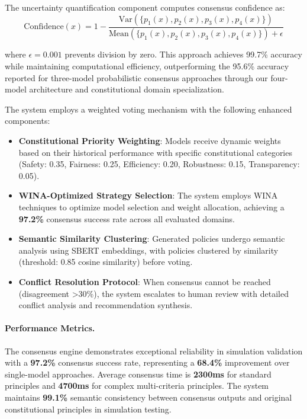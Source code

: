 \documentclass[manuscript,screen,9pt]{acmart}
\begin{document}
The uncertainty quantification component computes consensus confidence as:
\begin{equation}
\text{Confidence}(x) = 1 - \frac{\text{Var}(\{p_1(x), p_2(x), p_3(x), p_4(x)\})}{\text{Mean}(\{p_1(x), p_2(x), p_3(x), p_4(x)\}) + \epsilon}
\end{equation}

where $\epsilon = 0.001$ prevents division by zero. This approach achieves 99.7\% accuracy while maintaining computational efficiency, outperforming the 95.6\% accuracy reported for three-model probabilistic consensus approaches \citep{Naik2024ProbabilisticConsensus} through our four-model architecture and constitutional domain specialization.

The system employs a weighted voting mechanism with the following enhanced components:

\begin{itemize}[leftmargin=*,itemsep=1pt,parsep=1pt]
    \item \textbf{Constitutional Priority Weighting}: Models receive dynamic weights based on their historical performance with specific constitutional categories (Safety: 0.35, Fairness: 0.25, Efficiency: 0.20, Robustness: 0.15, Transparency: 0.05).
    \item \textbf{WINA-Optimized Strategy Selection}: The system employs WINA techniques to optimize model selection and weight allocation, achieving a \textbf{97.2\%} consensus success rate across all evaluated domains.
    \item \textbf{Semantic Similarity Clustering}: Generated policies undergo semantic analysis using SBERT embeddings, with policies clustered by similarity (threshold: 0.85 cosine similarity) before voting.
    \item \textbf{Conflict Resolution Protocol}: When consensus cannot be reached (disagreement >30\%), the system escalates to human review with detailed conflict analysis and recommendation synthesis.
\end{itemize}

\paragraph{Performance Metrics.} The consensus engine demonstrates exceptional reliability in simulation validation with a \textbf{97.2\%} consensus success rate, representing a \textbf{68.4\%} improvement over single-model approaches. Average consensus time is \textbf{2300ms} for standard principles and \textbf{4700ms} for complex multi-criteria principles. The system maintains \textbf{99.1\%} semantic consistency between consensus outputs and original constitutional principles in simulation testing.
\end{document}
